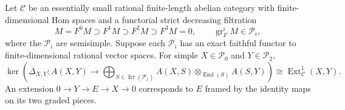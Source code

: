 \begin{lemma}
\label{cp:lem-three-level-framed}
Let \(\mathcal C\) be an essentially small rational finite-length abelian
category with finite-dimensional Hom spaces and a
functorial strict decreasing filtration
\[
 M=F^0M\supset F^1M\supset F^2M\supset F^3M=0,
 \qquad \operatorname{gr}_F^iM\in\mathcal P_i,
\]
where the \(\mathcal P_i\) are semisimple.  Suppose each \(\mathcal P_i\)
has an exact faithful functor to finite-dimensional rational vector spaces.
For simple \(X\in\mathcal P_0\) and \(Y\in\mathcal P_2\),
\begin{equation}
\ker\!\left(
 \overline\Delta_{X,Y}:A(X,Y)\longrightarrow
 \bigoplus_{S\in\operatorname{Irr}(\mathcal P_1)}
 A(X,S)\otimes_{\operatorname{End}(S)}A(S,Y)
\right)
\cong\operatorname{Ext}^1_{\mathcal C}(X,Y).
\label{cp:eq-three-level-kernel}
\end{equation}
An extension \(0\to Y\to E\to X\to0\) corresponds to \(E\) framed by
the identity maps on its two graded pieces.
\end{lemma}

